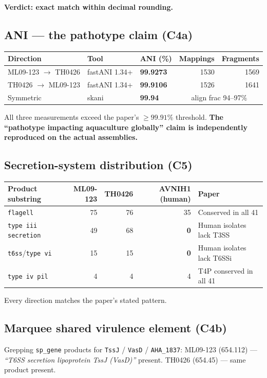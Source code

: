 \documentclass[11pt]{article}
\begin{document}
\textbf{Verdict: exact match within decimal rounding.} \checkmark

\subsection{ANI --- the pathotype claim (C4a)}
\begin{center}
\begin{tabular}{@{}lllrr@{}}
\toprule
Direction & Tool & ANI (\%) & Mappings & Fragments \\
\midrule
ML09-123 $\rightarrow$ TH0426 & fastANI 1.34+ & \textbf{99.9273} & 1530 & 1569 \\
TH0426 $\rightarrow$ ML09-123 & fastANI 1.34+ & \textbf{99.9106} & 1526 & 1641 \\
Symmetric                     & skani         & \textbf{99.94}   & \multicolumn{2}{c}{align frac 94--97\%} \\
\bottomrule
\end{tabular}
\end{center}

All three measurements exceed the paper's $\geq 99.91\%$ threshold. \textbf{The
``pathotype impacting aquaculture globally'' claim is independently reproduced
on the actual assemblies.} \checkmark

\subsection{Secretion-system distribution (C5)}
\begin{center}
\begin{tabular}{@{}lrrrl@{}}
\toprule
Product substring & ML09-123 & TH0426 & AVNIH1 (human) & Paper \\
\midrule
\texttt{flagell}                 & 75 & 76 & 35 & Conserved in all 41 \\
\texttt{type iii secretion}      & 49 & 68 & \textbf{0}  & Human isolates lack T3SS \\
\texttt{t6ss}/\texttt{type vi}   & 15 & 15 & \textbf{0}  & Human isolates lack T6SSi \\
\texttt{type iv pil}             & 4  & 4  & 4  & T4P conserved in all 41 \\
\bottomrule
\end{tabular}
\end{center}

Every direction matches the paper's stated pattern. \checkmark

\subsection{Marquee shared virulence element (C4b)}
Grepping \texttt{sp\_gene} products for \texttt{TssJ} / \texttt{VasD} /
\texttt{AHA\_1837}: ML09-123 (654.112) --- \emph{``T6SS secretion lipoprotein
TssJ (VasD)''} present. TH0426 (654.45) --- same product present.
\end{document}
